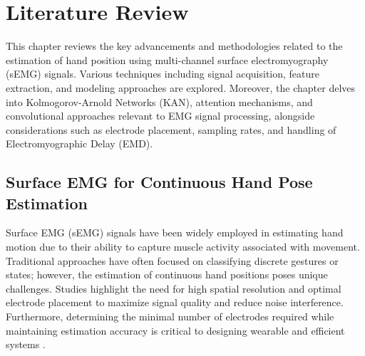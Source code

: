 \chapter{Literature Review}
\label{chap:lr}



This chapter reviews the key advancements and methodologies related to the estimation of hand position using multi-channel surface electromyography (sEMG) signals. Various techniques including signal acquisition, feature extraction, and modeling approaches are explored. Moreover, the chapter delves into Kolmogorov-Arnold Networks (KAN), attention mechanisms, and convolutional approaches relevant to EMG signal processing, alongside considerations such as electrode placement, sampling rates, and handling of Electromyographic Delay (EMD).

\section{Surface EMG for Continuous Hand Pose Estimation}
Surface EMG (sEMG) signals have been widely employed in estimating hand motion due to their ability to capture muscle activity associated with movement. Traditional approaches have often focused on classifying discrete gestures or states; however, the estimation of continuous hand positions poses unique challenges. Studies highlight the need for high spatial resolution and optimal electrode placement to maximize signal quality and reduce noise interference. Furthermore, determining the minimal number of electrodes required while maintaining estimation accuracy is critical to designing wearable and efficient systems \cite{phinyomark2012electromyography}.

